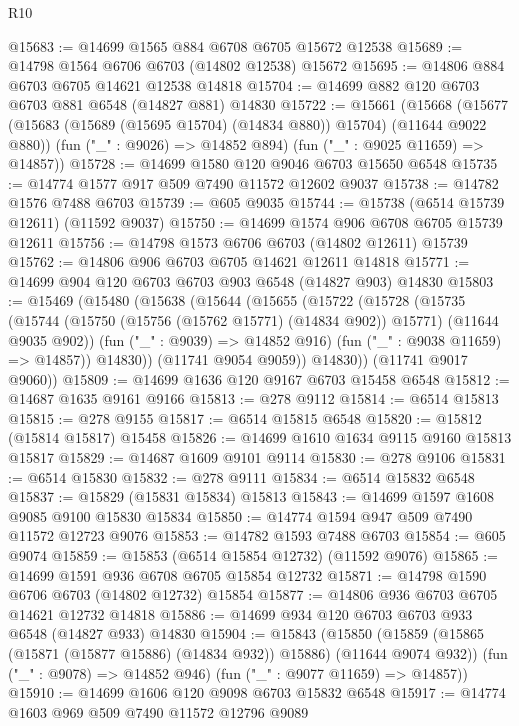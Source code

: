 \begin{lexlean}{R10}
\begin{coremodule}
@15683 := @14699 @1565 @884 @6708 @6705 @15672 @12538
@15689 := @14798 @1564 @6706 @6703 (@14802 @12538) @15672
@15695 := @14806 @884 @6703 @6705 @14621 @12538 @14818
@15704 := @14699 @882 @120 @6703 @6703 @881 @6548 (@14827 @881) @14830
@15722 := @15661
    (@15668
      (@15677 (@15683 (@15689 (@15695 @15704) (@14834 @880)) @15704) (@11644 @9022 @880))
      (fun ("_" : @9026) => @14852 @894)
      (fun ("_" : @9025 @11659) => @14857))
@15728 := @14699 @1580 @120 @9046 @6703 @15650 @6548
@15735 := @14774 @1577 @917 @509 @7490 @11572 @12602 @9037
@15738 := @14782 @1576 @7488 @6703
@15739 := @605 @9035
@15744 := @15738 (@6514 @15739 @12611) (@11592 @9037)
@15750 := @14699 @1574 @906 @6708 @6705 @15739 @12611
@15756 := @14798 @1573 @6706 @6703 (@14802 @12611) @15739
@15762 := @14806 @906 @6703 @6705 @14621 @12611 @14818
@15771 := @14699 @904 @120 @6703 @6703 @903 @6548 (@14827 @903) @14830
@15803 := @15469
    (@15480
      (@15638
        (@15644
          (@15655
            (@15722
              (@15728
                (@15735
                  (@15744
                    (@15750 (@15756 (@15762 @15771) (@14834 @902)) @15771)
                    (@11644 @9035 @902))
                  (fun ("_" : @9039) => @14852 @916)
                  (fun ("_" : @9038 @11659) => @14857))
                @14830))
            (@11741 @9054 @9059))
          @14830))
      (@11741 @9017 @9060))
@15809 := @14699 @1636 @120 @9167 @6703 @15458 @6548
@15812 := @14687 @1635 @9161 @9166
@15813 := @278 @9112
@15814 := @6514 @15813
@15815 := @278 @9155
@15817 := @6514 @15815 @6548
@15820 := @15812 (@15814 @15817) @15458
@15826 := @14699 @1610 @1634 @9115 @9160 @15813 @15817
@15829 := @14687 @1609 @9101 @9114
@15830 := @278 @9106
@15831 := @6514 @15830
@15832 := @278 @9111
@15834 := @6514 @15832 @6548
@15837 := @15829 (@15831 @15834) @15813
@15843 := @14699 @1597 @1608 @9085 @9100 @15830 @15834
@15850 := @14774 @1594 @947 @509 @7490 @11572 @12723 @9076
@15853 := @14782 @1593 @7488 @6703
@15854 := @605 @9074
@15859 := @15853 (@6514 @15854 @12732) (@11592 @9076)
@15865 := @14699 @1591 @936 @6708 @6705 @15854 @12732
@15871 := @14798 @1590 @6706 @6703 (@14802 @12732) @15854
@15877 := @14806 @936 @6703 @6705 @14621 @12732 @14818
@15886 := @14699 @934 @120 @6703 @6703 @933 @6548 (@14827 @933) @14830
@15904 := @15843
    (@15850
      (@15859 (@15865 (@15871 (@15877 @15886) (@14834 @932)) @15886) (@11644 @9074 @932))
      (fun ("_" : @9078) => @14852 @946)
      (fun ("_" : @9077 @11659) => @14857))
@15910 := @14699 @1606 @120 @9098 @6703 @15832 @6548
@15917 := @14774 @1603 @969 @509 @7490 @11572 @12796 @9089

\end{coremodule}
\end{lexlean}
